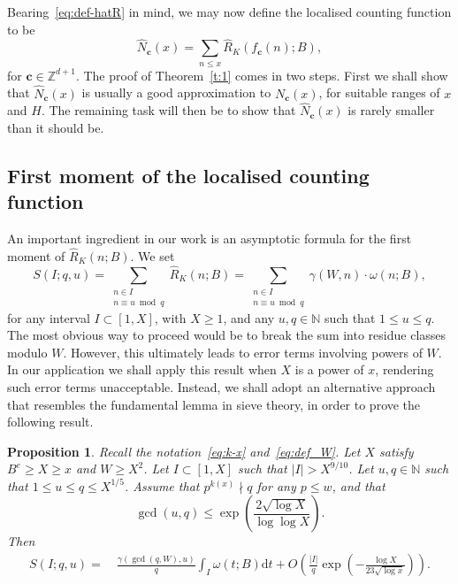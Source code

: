 \documentclass[11pt,letterpaper]{amsart}
\renewcommand{\leq}{\leqslant}
\renewcommand{\geq}{\geqslant}
\renewcommand{\d}{\mathrm{d}}
\newtheorem{proposition}[theorem]{Proposition}
\theoremstyle{definition}
\numberwithin{equation}{section}
\newcommand\ZZ{\mathbb{Z}}
\newcommand\NN{\mathbb{N}}
\renewcommand{\c}{\mathbf{c}}
\DeclareMathOperator{\n}{N}
\newcommand{\0}{\mathbf{0}}
\begin{document}
Bearing~\eqref{eq:def-hatR} in mind, 
we may now define the localised  counting function to be
$$
\hat N_\c(x)=\sum_{n\leq x} \hat R_K(f_\c(n);B),
$$
for $\c\in \ZZ^{d+1}$.
The proof of 
Theorem~\ref{t:1} comes in two steps. First we shall show that $\hat N_\c(x)$ is usually a good approximation to $N_\c(x)$, for suitable ranges of $x$ and $H$. 
The remaining task will then be to show that 
$\hat N_\c(x)$ is rarely smaller than it should be. 




\subsection{First moment of the localised counting function}

An important ingredient in our work is an asymptotic formula for the first moment of $\hat R_K(n;B)$.
We set
$$
S(I;q,u)=\sum_{\substack{n\in I \\n\equiv u\bmod q}}\hat R_K(n;B)= \sum_{\substack{n\in I\\n\equiv u\bmod q}}\gamma(W,n) \cdot \omega(n;B),
$$
for any interval $I\subset [1,X]$, with 
 $X\geq 1$,  and any   $u,q\in \NN$ such that $1\leq u\leq q$.
The most obvious way to proceed would be to break the sum into residue classes modulo $W$. However, this ultimately leads to error terms involving powers of $W$. In our application we shall apply this result when $X$ is a power of $x$, rendering such error terms unacceptable.
Instead, we shall 
adopt an alternative  approach that  resembles the fundamental lemma in sieve theory, in order to prove the following result. 

\begin{proposition}\label{prop:1moment} Recall the notation~\eqref{eq:k-x} and~\eqref{eq:def_W}.
Let $X$ satisfy  $B^e\geq X\geq x$ and $W\geq X^2$. Let $I\subset [1,X]$ such that $|I|>X^{9/10}$. 
Let $u,q\in \NN$ such that $1\leq u\leq q\leq X^{1/5}$. Assume that $p^{k(x)}\nmid q$ for any $p\leq w$, and that
 \begin{equation}\label{eq:assume-gcd}
\gcd(u,q)\leq \exp \left(\frac{2\sqrt{\log X}}{\log\log X}\right).
\end{equation}
Then 
\begin{align*}
S(I;q,u)=~& \frac{\gamma(\gcd(q,W),u)}{q}\int_{I} \omega(t;B)\d t  +
 O\left(\frac{|I|}{q}
 \exp\left(-\frac{\log X}{23\sqrt{\log x}} \right)
\right).
\end{align*}
\end{proposition}
\end{document}
